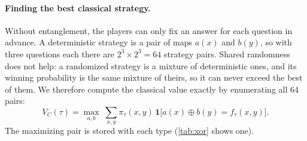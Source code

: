 \documentclass[10pt]{article}
\newcommand{\xor}{\mathbin{\oplus}}
\begin{document}
\paragraph{Finding the best classical strategy.} Without entanglement, the players can only fix an answer for each question in advance. A deterministic strategy is a pair of maps $a(x)$ and $b(y)$, so with three questions each there are $2^3\times2^3=64$ strategy pairs. Shared randomness does not help: a randomized strategy is a mixture of deterministic ones, and its winning probability is the same mixture of theirs, so it can never exceed the best of them. We therefore compute the classical value exactly by enumerating all 64 pairs:
\begin{equation}
  V_C(\tau)=\max_{a,b}\;\sum_{x,y}\pi_\tau(x,y)\,\mathbf 1\bigl[a(x)\xor b(y)=f_\tau(x,y)\bigr].
\end{equation}
The maximizing pair is stored with each type (\cref{tab:xor} shows one).
\end{document}
